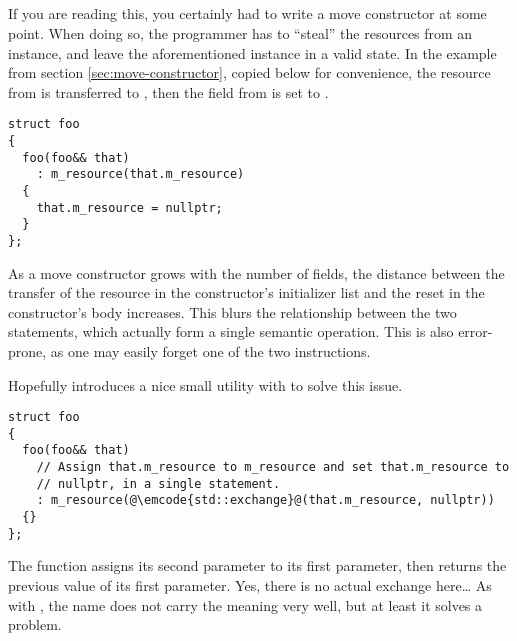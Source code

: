 \subsection{}%
%
\problemtitle%
%
%
%
If you are reading this, you certainly had to write a move constructor
at some point. When doing so, the programmer has to ``steal'' the
resources from an instance, and leave the aforementioned instance in a
valid state. In the example from section \ref{sec:move-constructor},
copied below for convenience, the resource from  is
transferred to , then the field from  is set to
.

\begin{lstlisting}
struct foo
{
  foo(foo&& that)
    : m_resource(that.m_resource)
  {
    that.m_resource = nullptr;
  }
};
\end{lstlisting}

As a move constructor grows with the number of fields, the distance
between the transfer of the resource in the constructor's initializer
list and the reset in the constructor's body increases. This blurs the
relationship between the two statements, which actually form a single
semantic operation. This is also error-prone, as one may easily forget
one of the two instructions.

\solutiontitle

Hopefully  introduces a nice small utility with
 to solve this issue.

\begin{lstlisting}
struct foo
{
  foo(foo&& that)
    // Assign that.m_resource to m_resource and set that.m_resource to
    // nullptr, in a single statement.
    : m_resource(@\emcode{std::exchange}@(that.m_resource, nullptr))
  {}
};
\end{lstlisting}

The  function assigns its second parameter to its
first parameter, then returns the previous value of its first
parameter. Yes, there is no actual exchange here… As with
, the name does not carry the meaning very well, but
at least it solves a problem.

